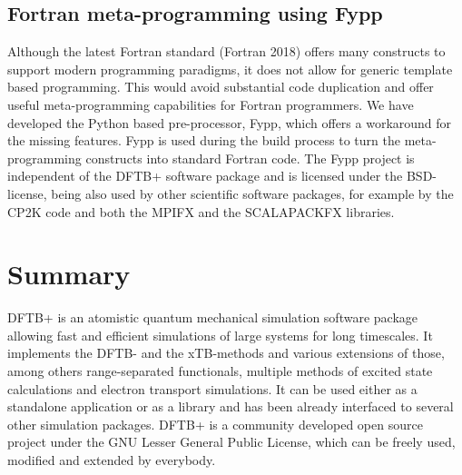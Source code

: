 \documentclass[reprint,onecolumn,superscriptaddress]{revtex4-1}
\newcommand{\dftbp}{DFTB+}
\begin{document}
\subsection{Fortran meta-programming using Fypp}
Although the latest Fortran standard (Fortran 2018) offers many constructs to
support modern programming paradigms, it does not allow for generic template
based programming. This would avoid substantial code duplication and offer
useful meta-programming capabilities for Fortran programmers. We have developed
the Python based pre-processor, Fypp,\cite{fypp-repo} which offers a workaround
for the missing features. Fypp is used during the build process to
turn the meta-programming constructs into standard Fortran code. The
Fypp project is independent of the \dftbp{} software package and is licensed
under the BSD-license, being also used by other scientific software packages,
for example by the CP2K code\cite{cp2k-repo} and both the MPIFX and the
SCALAPACKFX libraries.


\section{Summary}

\dftbp{} is an atomistic quantum mechanical simulation software package allowing
fast and efficient simulations of large systems for long timescales. It
implements the DFTB- and the xTB-methods and various extensions of those, among
others range-separated functionals, multiple methods of excited state
calculations and electron transport simulations. It can be used either as a
standalone application or as a library and has been already interfaced to
several other simulation packages. \dftbp{} is a community developed open source
project under the GNU Lesser General Public License, which can be freely used,
modified and extended by everybody.
\end{document}

